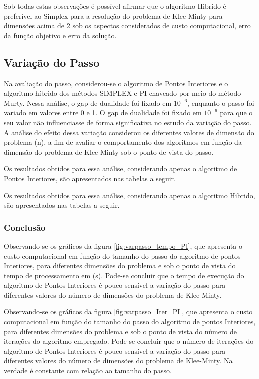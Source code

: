 \documentclass[11pt,a4paper]{article}
\begin{document}
            Sob todas estas observações é possível afirmar que o algoritmo Hibrido é preferível ao Simplex para a resolução do problema de Klee-Minty para dimensões acima de 2 sob os aspectos considerados de custo computacional, erro da função objetivo e erro da solução.
            
        \newpage
    
    \subsection{Variação do Passo}
    
        Na avaliação do passo, considerou-se o algoritmo de Pontos Interiores e o algoritmo híbrido dos métodos SIMPLEX e PI chaveado por meio do método Murty. Nessa análise, o gap de dualidade foi fixado em $10^{-6}$, enquanto o passo foi variado em valores entre 0 e 1. O gap de dualidade foi fixado em $10^{-6}$ para que o seu valor não influenciasse de forma significativa no estudo da variação do passo. A análise do efeito dessa variação  considerou os diferentes valores de dimensão do problema (n), a fim de avaliar o comportamento dos algoritmos em função da dimensão do problema de Klee-Minty sob o ponto de vista do passo. 
        
        Os resultados obtidos para essa análise, considerando apenas o algoritmo de Pontos Interiores, são apresentados nas tabelas a seguir.

         

        Os resultados obtidos para essa análise, considerando apenas o algoritmo Hibrido, são apresentados nas tabelas a seguir.
        
        

        \subsubsection{Conclusão}
        
            Observando-se os gráficos da figura \ref{fig:varpasso_tempo_PI}, que apresenta o custo computacional em função do tamanho do passo do algoritmo de pontos Interiores, para diferentes dimensões do problema e sob o ponto de vista do tempo de processamento em (s). Pode-se concluir que o tempo de execução do algoritmo de Pontos Interiores é pouco sensível a variação do passo para diferentes valores do número de dimensões do problema de Klee-Minty.
            
            Observando-se os gráficos da figura \ref{fig:varpasso_Iter_PI}, que apresenta o custo computacional em função do tamanho do passo do algoritmo de pontos Interiores, para diferentes dimensões do problema e sob o ponto de vista do número de iterações do algoritmo empregado. Pode-se concluir que o número de iterações do algoritmo de Pontos Interiores é pouco sensível a variação do passo para diferentes valores do número de dimensões do problema de Klee-Minty. Na verdade é constante com relação ao tamanho do passo.
\end{document}
